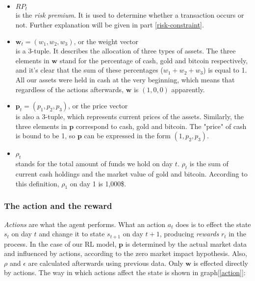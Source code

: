 \documentclass{mcmthesis}
\begin{document}
\begin{itemize}
  \item $RP_t$ \\
  is the \textit{risk premium}.
  It is used to determine whether a transaction occurs or not.
  Further explanation will be given in part \ref{risk-constraint}.

  \item $\pmb{w}_t = (w_1, w_2, w_3)$, or the weight vector \\ is a 3-tuple.
  It describes the allocation of three types of assets.
  The three elements in $\pmb{w}$ stand for the percentage of cash, gold and bitcoin respectively,
  and it's clear that the sum of these percentages ($w_1+w_2+w_3$) is equal to 1.\\
  All our assets were held in cash at the very beginning,
  which means that regardless of the actions afterwards,
  $\pmb{w}$ is $(1,0,0)$ apparently.

  \item $\pmb{p}_t = (p_1, p_2, p_3)$, or the price vector \\ is also a 3-tuple,
  which represents current prices of the assets.
  Similarly, the three elements in $\pmb{p}$ correspond to cash, gold and bitcoin.
  The "price" of cash is bound to be 1,
  so $\pmb{p}$ can be expressed in the form $(1,p_2,p_3)$.

  \item $\rho_t$\\
  stands for the total amount of funds we hold on day $t$.
  $\rho _t$ is the sum of current cash holdings and the market value of gold and bitcoin.
  According to this definition, $\rho _1$ on day 1 is 1,000\$.
\end{itemize}

\subsubsection{The action and the reward}

\textit{Actions} are what the agent performs.
What an action $a_t$ does is to effect the state $s_t$ on day $t$
and change it to state $s_{t+1}$ on day $t+1$,
producing \textit{rewards} $r_t$ in the process.
In the case of our RL model,
$\pmb{p}$ is determined by the actual market data and influenced by actions,
according to the zero market impact hypothesis.
Also, $\rho $ and $\epsilon$ are calculated afterwards using previous data.
Only $\pmb{w}$ is effected directly by actions.
The way in which actions affect the state is shown in graph[\ref{action}]:
\end{document}
